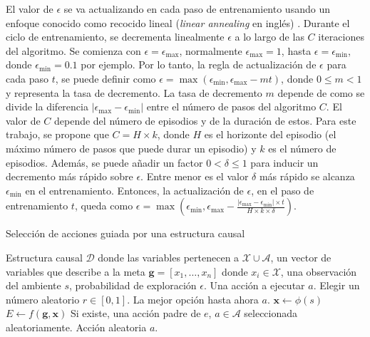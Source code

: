 El valor de $\epsilon$ se va actualizando en cada paso de entrenamiento usando un enfoque conocido como recocido lineal (\textit{linear annealing} en inglés) \cite{pan2018policy}. Durante el ciclo de entrenamiento, se decrementa linealmente $\epsilon$ a lo largo de las $C$ iteraciones del algoritmo. Se comienza con $\epsilon = \epsilon_{\max}$, normalmente $\epsilon_{\max} = 1$, hasta $\epsilon = \epsilon_{\min}$, donde $\epsilon_{\min}=0.1$ por ejemplo. 
Por lo tanto, la regla de actualización de $\epsilon$ para cada paso $t$, se puede definir como
$\epsilon = \max(\epsilon_{\min}, \epsilon_{\max} - m t)$, donde $0 \leq m < 1$ y representa la tasa de decremento. La tasa de decremento $m$ depende de como se divide la diferencia $|\epsilon_{\max} - \epsilon_{\min}|$ entre el número de pasos del algoritmo $C$. El valor de $C$ depende del número de episodios y de la duración de estos. Para este trabajo, se propone que $C = H \times k$, donde $H$ es el horizonte del episodio (el máximo número de pasos que puede durar un episodio) y $k$ es el número de episodios. Además, se puede añadir un factor $0 < \delta \leq 1$ para inducir un decremento más rápido sobre $\epsilon$. Entre menor es el valor $\delta$
más rápido se alcanza $\epsilon_{\min}$ en el entrenamiento. Entonces, la actualización de $\epsilon$, en el paso de entrenamiento $t$, queda como $\epsilon = \max(\epsilon_{\min}, \epsilon_{\max} - \frac{|\epsilon_{\max} - \epsilon_{\min}| \times t}{H \times k \times \delta})$.


\begin{mialgoritmo}
  \caption{Selección de acciones guiada por una estructura causal \label{alg:guided-action-selection}}
  \begin{algorithmic}[1]
  \REQUIRE Estructura causal $\mathcal{D}$ donde las variables pertenecen a $\mathcal{X} \cup \mathcal{A}$, un vector de variables
  que describe a la meta $\mathbf{g} = [x_1, \dots, x_n]$ donde $x_i \in \mathcal{X}$, una observación del ambiente $s$, probabilidad de exploración $\epsilon$.
  \ENSURE Una acción a ejecutar $a$.
  \STATE Elegir un número aleatorio $r \in [0, 1]$.
    \RETURN La mejor opción hasta ahora $a$.
   \ENDIF
  \STATE $\mathbf{x} \leftarrow \phi(s)$ 
   \STATE $E \leftarrow f(\mathbf{g}, \mathbf{x})$ 
        \RETURN Si existe, una acción padre de $e$, $a \in \mathcal{A}$ seleccionada aleatoriamente.
    \ENDIF
    \ENDFOR
    \RETURN Acción aleatoria $a$.
  \end{algorithmic}
\end{mialgoritmo}



